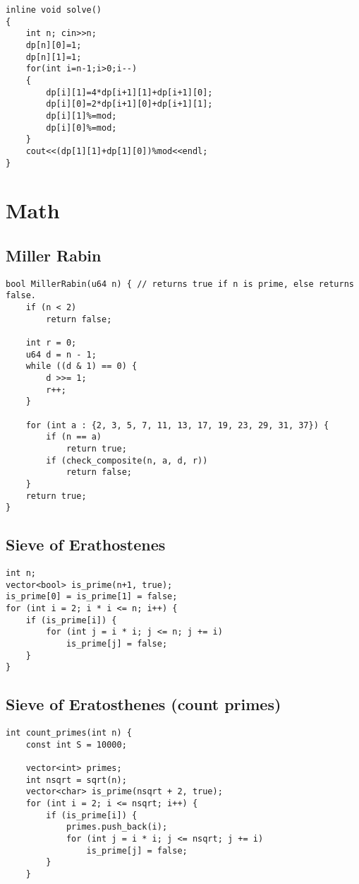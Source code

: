 \documentclass[10pt]{article}
\begin{document}
\begin{multicols*}{2}
\begin{lstlisting}[style=compactcpp]
inline void solve()
{
    int n; cin>>n;
    dp[n][0]=1;
    dp[n][1]=1;
    for(int i=n-1;i>0;i--)
    {
        dp[i][1]=4*dp[i+1][1]+dp[i+1][0];
        dp[i][0]=2*dp[i+1][0]+dp[i+1][1];
        dp[i][1]%=mod;
        dp[i][0]%=mod;
    }
    cout<<(dp[1][1]+dp[1][0])%mod<<endl;
}
\end{lstlisting}

\section{Math}

\subsection{Miller Rabin }

\begin{lstlisting}[style=compactcpp]
bool MillerRabin(u64 n) { // returns true if n is prime, else returns false.
    if (n < 2)
        return false;

    int r = 0;
    u64 d = n - 1;
    while ((d & 1) == 0) {
        d >>= 1;
        r++;
    }

    for (int a : {2, 3, 5, 7, 11, 13, 17, 19, 23, 29, 31, 37}) {
        if (n == a)
            return true;
        if (check_composite(n, a, d, r))
            return false;
    }
    return true;
}
\end{lstlisting}

\subsection{Sieve of Erathostenes}

\begin{lstlisting}[style=compactcpp]
int n;
vector<bool> is_prime(n+1, true);
is_prime[0] = is_prime[1] = false;
for (int i = 2; i * i <= n; i++) {
    if (is_prime[i]) {
        for (int j = i * i; j <= n; j += i)
            is_prime[j] = false;
    }
}
\end{lstlisting}

\subsection{Sieve of Eratosthenes (count primes)}
\begin{lstlisting}[style=compactcpp]
int count_primes(int n) {
    const int S = 10000;

    vector<int> primes;
    int nsqrt = sqrt(n);
    vector<char> is_prime(nsqrt + 2, true);
    for (int i = 2; i <= nsqrt; i++) {
        if (is_prime[i]) {
            primes.push_back(i);
            for (int j = i * i; j <= nsqrt; j += i)
                is_prime[j] = false;
        }
    }


\end{lstlisting}
\end{multicols*}
\end{document}

